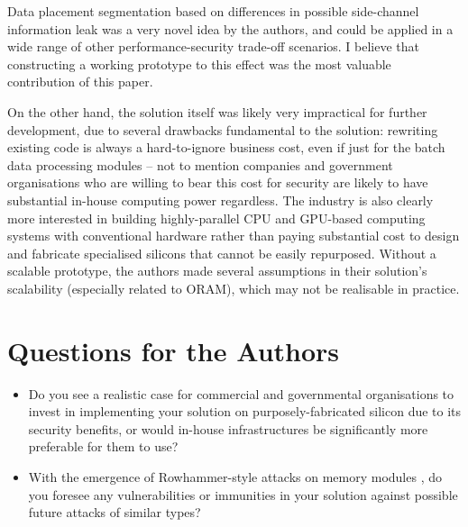 \documentclass[11pt]{article}
\begin{document}
Data placement segmentation based on differences in possible side-channel information leak was a very novel idea by the authors, and could be applied in a wide range of other performance-security trade-off scenarios. I believe that constructing a working prototype to this effect was the most valuable contribution of this paper.

On the other hand, the solution itself was likely very impractical for further development, due to several drawbacks fundamental to the solution: rewriting existing code is always a hard-to-ignore business cost, even if just for the batch data processing modules -- not to mention companies and government organisations who are willing to bear this cost for security are likely to have substantial in-house computing power regardless. The industry is also clearly more interested in building highly-parallel CPU and GPU-based computing systems with conventional hardware rather than paying substantial cost to design and fabricate specialised silicons that cannot be easily repurposed. Without a scalable prototype, the authors made several assumptions in their solution's scalability (especially related to ORAM), which may not be realisable in practice.

\section*{Questions for the Authors}

\begin{itemize}
	\item Do you see a realistic case for commercial and governmental organisations to invest in implementing your solution on purposely-fabricated silicon due to its security benefits, or would in-house infrastructures be significantly more preferable for them to use?
	\item With the emergence of Rowhammer-style attacks on memory modules \cite{razavi2016flip}, do you foresee any vulnerabilities or immunities in your solution against possible future attacks of similar types?
\end{itemize}


\footnotesize{}
\end{document}

